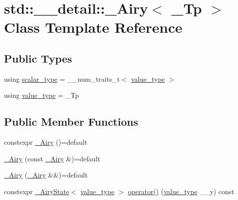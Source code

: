 \hypertarget{classstd_1_1____detail_1_1__Airy}{}\section{std\+:\+:\+\_\+\+\_\+detail\+:\+:\+\_\+\+Airy$<$ \+\_\+\+Tp $>$ Class Template Reference}
\label{classstd_1_1____detail_1_1__Airy}
\subsection*{Public Types}
\begin{DoxyCompactItemize}
\item 
using \hyperlink{classstd_1_1____detail_1_1__Airy_a4b2b920ead7adcf08d49420c24e491b5}{scalar\+\_\+type} = \+\_\+\+\_\+num\+\_\+traits\+\_\+t$<$ \hyperlink{classstd_1_1____detail_1_1__Airy_a99e7e546930fbd7a846f6933a9b4b437}{value\+\_\+type} $>$
\item 
using \hyperlink{classstd_1_1____detail_1_1__Airy_a99e7e546930fbd7a846f6933a9b4b437}{value\+\_\+type} = \+\_\+\+Tp
\end{DoxyCompactItemize}
\subsection*{Public Member Functions}
\begin{DoxyCompactItemize}
\item 
constexpr \hyperlink{classstd_1_1____detail_1_1__Airy_a7f9ac77b331e5fdf275923c66d833954}{\+\_\+\+Airy} ()=default
\item 
\hyperlink{classstd_1_1____detail_1_1__Airy_a5e85ee9455eebffcd4e53c0acab47475}{\+\_\+\+Airy} (const \hyperlink{classstd_1_1____detail_1_1__Airy}{\+\_\+\+Airy} \&)=default
\item 
\hyperlink{classstd_1_1____detail_1_1__Airy_a6817af23cf74252d00f3a300f2c0b0eb}{\+\_\+\+Airy} (\hyperlink{classstd_1_1____detail_1_1__Airy}{\+\_\+\+Airy} \&\&)=default
\item 
constexpr \hyperlink{structstd_1_1____detail_1_1__AiryState}{\+\_\+\+Airy\+State}$<$ \hyperlink{classstd_1_1____detail_1_1__Airy_a99e7e546930fbd7a846f6933a9b4b437}{value\+\_\+type} $>$ \hyperlink{classstd_1_1____detail_1_1__Airy_aae4af53f88751d35b028055a2f8c5e2b}{operator()} (\hyperlink{classstd_1_1____detail_1_1__Airy_a99e7e546930fbd7a846f6933a9b4b437}{value\+\_\+type} \+\_\+\+\_\+y) const
\end{DoxyCompactItemize}
